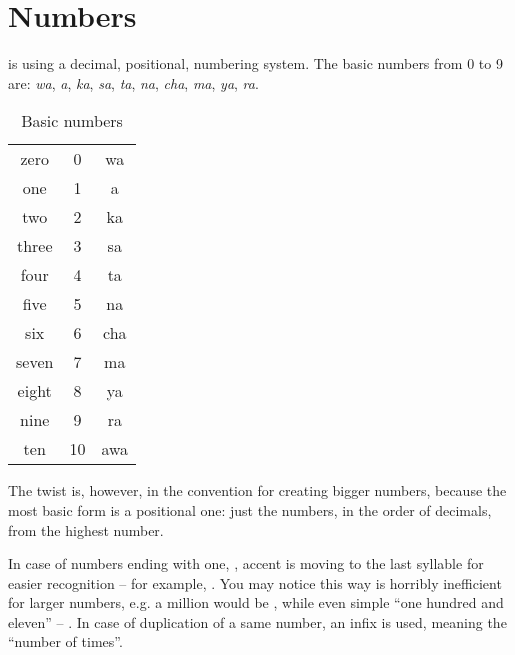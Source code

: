 

\section{Numbers}

\andro is using a decimal, positional, numbering system. The basic numbers from
0 to 9 are: \emph{wa}, \emph{a}, \emph{ka}, \emph{sa}, \emph{ta}, \emph{na},
\emph{cha}, \emph{ma}, \emph{ya}, \emph{ra}.

\begin{table}[ht]
  \centering
  \caption{Basic numbers}
  \begin{tabular}{ccc} \toprule
    zero  & 0  & wa  \\
    one   & 1  & a   \\
    two   & 2  & ka  \\
    three & 3  & sa  \\
    four  & 4  & ta  \\
    five  & 5  & na  \\
    six   & 6  & cha \\
    seven & 7  & ma  \\
    eight & 8  & ya  \\
    nine  & 9  & ra  \\
    ten   & 10 & awa \\\bottomrule
  \end{tabular}
  \label{tab:numerals}
\end{table}

The twist is, however, in the convention for creating bigger numbers, because
the most basic form is a positional one: just the numbers, in the order of
decimals, from the highest number.




In case of numbers ending with one, , accent is moving to the last
syllable for easier recognition -- for example, . You may notice
this way is horribly inefficient for larger numbers, e.g. a million would be
, while even simple ``one hundred and eleven'' --
. In case of duplication of a same number, an  infix is
used, meaning the ``number of times''.

